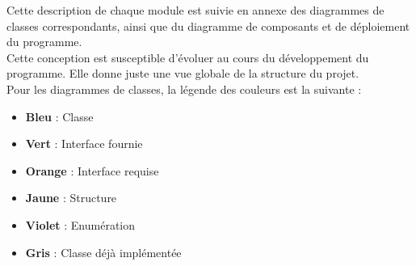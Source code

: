 Cette description de chaque module est suivie en annexe des diagrammes de classes correspondants, ainsi que du diagramme de composants et de déploiement du programme.\\

Cette conception est susceptible d'évoluer au cours du développement du programme. Elle donne juste une vue globale de la structure du projet.\\

Pour les diagrammes de classes, la légende des couleurs est la suivante :

\begin{itemize}
    \item \textbf{Bleu} : Classe
    \item \textbf{Vert} : Interface fournie
    \item \textbf{Orange} : Interface requise
    \item \textbf{Jaune} : Structure
    \item \textbf{Violet} : Enumération
    \item \textbf{Gris} : Classe déjà implémentée
\end{itemize}
